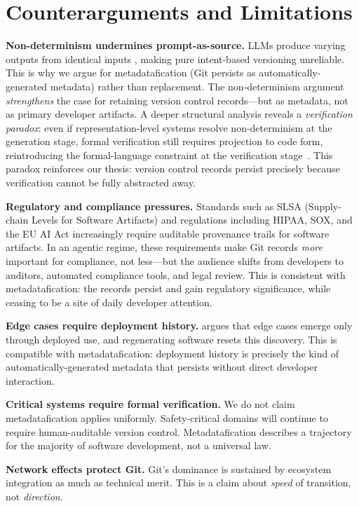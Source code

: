 \documentclass[sigconf, nonacm, anonymous=false]{acmart}
\begin{document}
\section{Counterarguments and Limitations}

\textbf{Non-determinism undermines prompt-as-source.} LLMs produce varying outputs from identical inputs \citep{hn2026provenance}, making pure intent-based versioning unreliable. This is why we argue for metadatafication (Git persists as automatically-generated metadata) rather than replacement. The non-determinism argument \textit{strengthens} the case for retaining version control records---but as metadata, not as primary developer artifacts. A deeper structural analysis reveals a \emph{verification paradox}: even if representation-level systems resolve non-determinism at the generation stage, formal verification still requires projection to code form, reintroducing the formal-language constraint at the verification stage~\citep{zgap2026chomsky}. This paradox reinforces our thesis: version control records persist precisely because verification cannot be fully abstracted away.

\textbf{Regulatory and compliance pressures.} Standards such as SLSA (Supply-chain Levels for Software Artifacts) and regulations including HIPAA, SOX, and the EU AI Act increasingly require auditable provenance trails for software artifacts. In an agentic regime, these requirements make Git records \textit{more} important for compliance, not less---but the audience shifts from developers to auditors, automated compliance tools, and legal review. This is consistent with metadatafication: the records persist and gain regulatory significance, while ceasing to be a site of daily developer attention.

\textbf{Edge cases require deployment history.} \citet{kirsch2026flawed} argues that edge cases emerge only through deployed use, and regenerating software resets this discovery. This is compatible with metadatafication: deployment history is precisely the kind of automatically-generated metadata that persists without direct developer interaction.

\textbf{Critical systems require formal verification.} We do not claim metadatafication applies uniformly. Safety-critical domains will continue to require human-auditable version control. Metadatafication describes a trajectory for the majority of software development, not a universal law.

\textbf{Network effects protect Git.} Git's dominance is sustained by ecosystem integration as much as technical merit. This is a claim about \textit{speed} of transition, not \textit{direction}.
\end{document}
